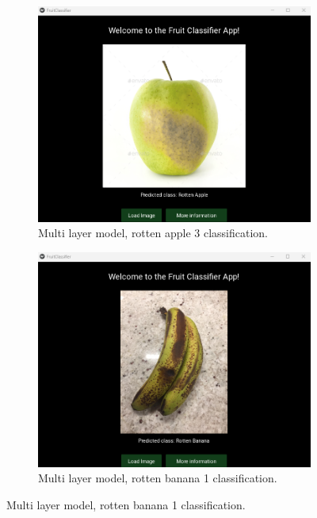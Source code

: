 \documentclass[conference]{IEEEtran}
\begin{document}
\begin{figure}[h]
\begin{subfigure}[b]{0.48\linewidth}
    \end{subfigure}
    \hfill
    \begin{subfigure}[b]{0.48\linewidth}
        \centering
        \includegraphics[width=\linewidth]{Mlayer appelR3.png}
        \caption{Multi layer model, rotten apple 3 classification.}
        \label{figFB}
    \end{subfigure}
    \hfill
    \begin{subfigure}[b]{0.48\linewidth}
        \centering
        \includegraphics[width=\linewidth]{Mlayer bananaR1.png}
        \caption{Multi layer model, rotten banana 1 classification.}
        \label{figFA}
    \end{subfigure}

\end{figure}
\end{document}
